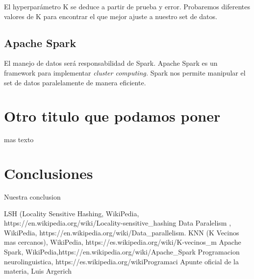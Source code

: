 \documentclass[a4paper,10pt]{article}
\begin{document}
	El hyperparámetro K se deduce a partir de prueba y error. Probaremos diferentes valores de K para encontrar el que mejor ajuste a nuestro set de datos.
	
	\subsection{Apache Spark}
	El manejo de datos será responsabilidad de Spark. Apache Spark es un framework para implementar \textit{cluster computing.} Spark nos permite manipular el set de datos paralelamente de manera eficiente. 
	
	
	\section{Otro titulo que podamos poner}
	
	mas texto
	
	\section{Conclusiones}
	
	Nuestra conclusion
	
	\begin{thebibliography}{99}
		 LSH (Locality Sensitive Hashing, WikiPedia, https://en.wikipedia.org/wiki/Locality-sensitive_hashing
		 Data Paralelism , WikiPedia, https://en.wikipedia.org/wiki/Data_parallelism.
		 KNN (K Vecinos mas cercanos), WikiPedia, https://es.wikipedia.org/wiki/K-vecinos_m%
		 Apache Spark, WikiPedia,https://en.wikipedia.org/wiki/Apache_Spark
		 Programacion neurolinguistica, https://es.wikipedia.org/wikiProgramaci%
		 Apunte oficial de la materia, Luis Argerich

	\end{thebibliography}
	
\end{document}
